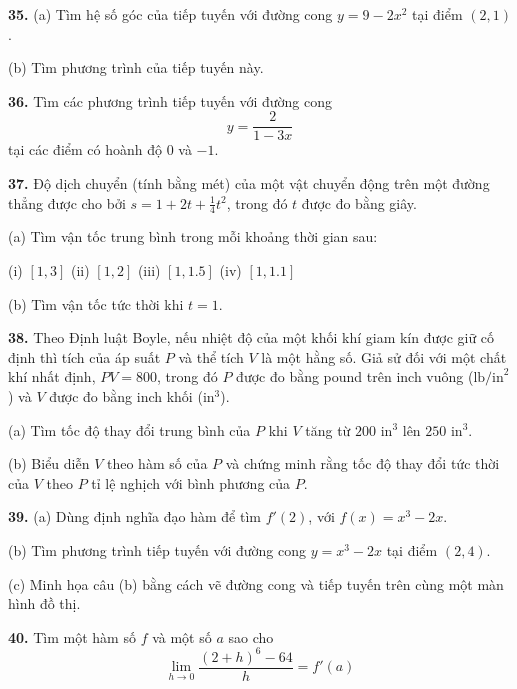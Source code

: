 \noindent
\begin{minipage}[t]{0.485\textwidth}
  \vspace{0pt}
  \textbf{35.} (a) Tìm hệ số góc của tiếp tuyến với đường cong $y = 9 - 2x^2$ tại điểm $(2, 1)$.\par
   (b) Tìm phương trình của tiếp tuyến này.

  \vspace{1pt}
  \textbf{36.} Tìm các phương trình tiếp tuyến với đường cong
  \[
  y = \frac{2}{1 - 3x}
  \]
  tại các điểm có hoành độ $0$ và $-1$.

  \vspace{1pt}
  \textbf{37.} Độ dịch chuyển (tính bằng mét) của một vật chuyển động trên một đường thẳng được cho bởi $s = 1 + 2t + \frac{1}{4}t^2$, trong đó $t$ được đo bằng giây.\par
  (a) Tìm vận tốc trung bình trong mỗi khoảng thời gian sau:\par
  \quad (i) $[1, 3]$ \quad (ii) $[1, 2]$ \quad (iii) $[1, 1.5]$ \quad (iv) $[1, 1.1]$\par
  (b) Tìm vận tốc tức thời khi $t = 1$.

  \vspace{1pt}
  \textbf{38.} Theo Định luật Boyle, nếu nhiệt độ của một khối khí giam kín được giữ cố định thì tích của áp suất $P$ và thể tích $V$ là một hằng số. Giả sử đối với một chất khí nhất định, $PV = 800$, trong đó $P$ được đo bằng pound trên inch vuông ($\text{lb/in}^2$) và $V$ được đo bằng inch khối ($\text{in}^3$).\par
  (a) Tìm tốc độ thay đổi trung bình của $P$ khi $V$ tăng từ $200\text{ in}^3$ lên $250\text{ in}^3$.\par
  (b) Biểu diễn $V$ theo hàm số của $P$ và chứng minh rằng tốc độ thay đổi tức thời của $V$ theo $P$ tỉ lệ nghịch với bình phương của $P$.

  \vspace{1pt}
  \textbf{39.} (a) Dùng định nghĩa đạo hàm để tìm $f'(2)$, với $f(x) = x^3 - 2x$.\par
   (b) Tìm phương trình tiếp tuyến với đường cong $y = x^3 - 2x$ tại điểm $(2, 4)$.\par
  \makebox[0pt][r]{\graphicon\hspace{3pt}}(c) Minh họa câu (b) bằng cách vẽ đường cong và tiếp tuyến trên cùng một màn hình đồ thị.

  \vspace{1pt}
  \textbf{40.} Tìm một hàm số $f$ và một số $a$ sao cho
  \[
  \lim_{h \to 0} \frac{(2 + h)^6 - 64}{h} = f'(a)
  \]


\end{minipage}
